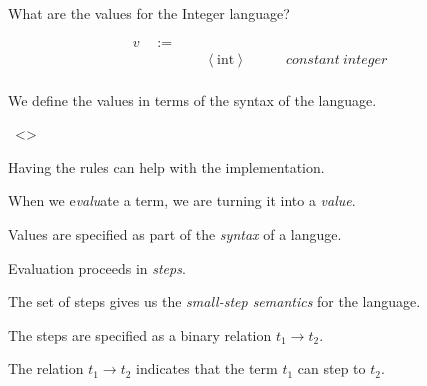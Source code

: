 \begin{frame}[c]
  What are the values for the Integer language?
\end{frame}

\begin{frame}
\begin{mdframed}[frametitle={By definitions:}]
\begin{displaymath}
    \begin{aligned}
v \quad:=\quad& ~ &\\
  & ~ \left<\text{int}\right> \quad\quad &constant~integer\\
    \end{aligned}
  \end{displaymath}
\end{mdframed}

\medskip

  We define the values in terms of the syntax of the language.
\end{frame}

\begin{frame}
\begin{mdframed}[frametitle={By rules:}]
  \infrule[V-Int]
          {}
          {~\left<\right>}
\end{mdframed}
\medskip
Having the rules can help with the implementation.
\end{frame}

\begin{frame}[c]
  When we e{\it valu}ate a term, we are turning it into a {\it value}.
\end{frame}

\begin{frame}[c]
    Values are specified as part of the {\it syntax} of a languge.
\end{frame}

\begin{frame}[c]
  Evaluation proceeds in {\it steps}.
\end{frame}

\begin{frame}[c]
  The set of steps gives us the {\it small-step semantics} for the language.
\end{frame}

\begin{frame}[c]
  The steps are specified as a binary relation $t_1 \longrightarrow t_2$.
\end{frame}

\begin{frame}[c]
  The relation $t_1 \longrightarrow t_2$ indicates that the term $t_1$ can step to $t_2$.
\end{frame}

